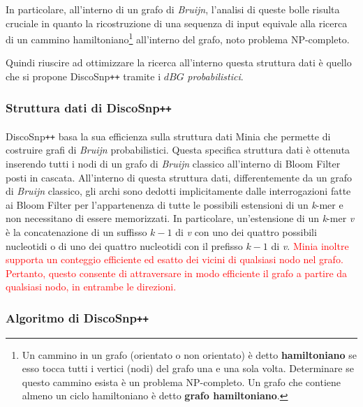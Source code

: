 \documentclass[../main.tex]{subfiles}
\begin{document}
In particolare, all'interno di un grafo di \textit{Bruijn}, l'analisi di queste bolle risulta cruciale in quanto la ricostruzione di una sequenza di input equivale alla ricerca di un cammino hamiltoniano\footnote{Un cammino in un grafo (orientato o non orientato) è detto \textbf{hamiltoniano} se esso tocca tutti i vertici (nodi) del grafo una e una sola volta. Determinare se questo cammino esista è un problema NP-completo. Un grafo che contiene almeno un ciclo hamiltoniano è detto \textbf{grafo hamiltoniano}.} all'interno del grafo, noto problema NP-completo.

 Quindi riuscire ad ottimizzare la ricerca all'interno questa struttura dati è quello che si propone DiscoSnp\texttt{++} tramite i $dBG$ \textit{probabilistici}.

\subsubsection{Struttura dati di DiscoSnp\texttt{++}}

\paragraph{} DiscoSnp\texttt{++} basa la sua efficienza sulla struttura dati Minia \cite{chikhi2013space} che permette di costruire grafi di \textit{Bruijn} probabilistici. Questa specifica struttura dati è ottenuta inserendo tutti i nodi di un grafo di \textit{Bruijn} classico all'interno di Bloom Filter posti in cascata. All'interno di questa struttura dati, differentemente da un grafo di \textit{Bruijn} classico, gli archi sono dedotti implicitamente dalle interrogazioni fatte ai Bloom Filter per l'appartenenza di tutte le possibili estensioni di un \textit{k}-mer e non necessitano di essere memorizzati. In particolare, un'estensione di un \textit{k}-mer \textit{v} è la concatenazione di un suffisso $\textit{k}-1$ di \textit{v} con uno dei quattro possibili nucleotidi o di uno dei quattro nucleotidi con il prefisso  $\textit{k}-1$ di \textit{v}. \textcolor{red}{Minia inoltre supporta un conteggio efficiente ed esatto dei vicini di qualsiasi nodo nel grafo. Pertanto, questo consente di attraversare in modo efficiente il grafo a partire da qualsiasi nodo, in entrambe le direzioni.}

\subsubsection{Algoritmo di DiscoSnp\texttt{++}}
\end{document}
